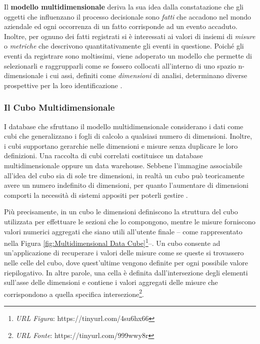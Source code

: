 Il \textbf{modello multidimensionale} deriva la sua idea dalla constatazione che gli oggetti che influenzano il processo decisionale sono \textit{fatti} che accadono nel mondo aziendale ed ogni occorrenza di un fatto corrisponde ad un evento accaduto. Inoltre, per ognuno dei fatti registrati si è interessati ai valori di insiemi di \textit{misure} o \textit{metriche} che descrivono quantitativamente gli eventi in questione. Poiché gli eventi da registrare sono moltissimi, viene adoperato un modello che permette di selezionarli e raggrupparli come se fossero collocati all'interno di uno spazio n-dimensionale i cui assi, definiti come \textit{dimensioni} di analisi, determinano diverse prospettive per la loro identificazione \cite{unibo_introduzione_al_data_warehousing}.

\subsubsection{Il Cubo Multidimensionale}

I database che sfruttano il modello multidimensionale considerano i dati come cubi che generalizzano i fogli di calcolo a qualsiasi numero di dimensioni. Inoltre, i cubi supportano gerarchie nelle dimensioni e misure senza duplicare le loro definizioni. Una raccolta di cubi correlati costituisce un database multidimensionale oppure un data warehouse. Sebbene l'immagine associabile all'idea del cubo sia di sole tre dimensioni, in realtà un cubo può teoricamente avere un numero indefinito di dimensioni, per quanto l'aumentare di dimensioni comporti la necessità di sistemi appositi per poterli gestire \cite{researchgate_multidimensional_db}.

Più precisamente, in un cubo le dimensioni definiscono la struttura del cubo utilizzata per effettuare le sezioni che lo compongono, mentre le misure forniscono valori numerici aggregati che siano utili all'utente finale -- come rappresentato nella Figura \ref{fig:Multidimensional Data Cube}\footnote{\textit{URL Figura}: https://tinyurl.com/4su6hx66}--. Un cubo consente ad un'applicazione di recuperare i valori delle misure come se queste si trovassero nelle celle del cubo, dove quest'ultime vengono definite per ogni possibile valore riepilogativo. In altre parole, una cella è definita dall'intersezione degli elementi sull'asse delle dimensioni e contiene i valori aggregati delle misure che corrispondono a quella specifica intersezione\footnote{\textit{URL Fonte}: https://tinyurl.com/999wwy8r}.

